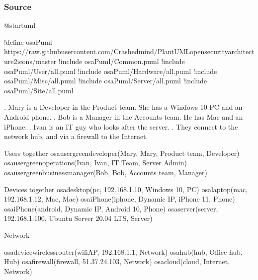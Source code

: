 \documentclass[letterpaper,10pt,english]{sphinxmanual}
\begin{document}
\subsubsection{Source}
\label{\detokenize{NetworkUsersMachines/NetworkUsersMachines:id12}}
%
\begin{sphinxVerbatim}[commandchars=\\\{\},numbers=left,firstnumber=1,stepnumber=1]
@startuml

!define osaPuml https://raw.githubusercontent.com/Crashedmind/PlantUML\PYGZhy{}opensecurityarchitecture2\PYGZhy{}icons/master
!include osaPuml/Common.puml
!include osaPuml/User/all.puml
!include osaPuml/Hardware/all.puml
!include osaPuml/Misc/all.puml
!include osaPuml/Server/all.puml
!include osaPuml/Site/all.puml

\PYGZsq{}. Mary is a Developer in the Product team. She has a Windows 10 PC and an Android phone.
\PYGZsq{}. Bob is a Manager in the Accounts team. He has Mac and an iPhone.
\PYGZsq{}. Ivan is an IT guy who looks after the server. 
\PYGZsq{}. They connect to the network hub, and via a firewall to the Internet.


\PYGZsq{} Users
together \PYGZob{}
osa\PYGZus{}user\PYGZus{}green\PYGZus{}developer(Mary, \PYGZdq{}Mary\PYGZdq{}, \PYGZdq{}Product team\PYGZdq{}, \PYGZdq{}Developer\PYGZdq{})
osa\PYGZus{}user\PYGZus{}green\PYGZus{}operations(Ivan, \PYGZdq{}Ivan\PYGZdq{}, \PYGZdq{}IT Team\PYGZdq{}, \PYGZdq{}Server Admin\PYGZdq{})
osa\PYGZus{}user\PYGZus{}green\PYGZus{}business\PYGZus{}manager(Bob, \PYGZdq{}Bob\PYGZdq{}, \PYGZdq{}Accounts team\PYGZdq{}, \PYGZdq{}Manager\PYGZdq{})
\PYGZcb{}

\PYGZsq{} Devices
together \PYGZob{}
osa\PYGZus{}desktop(pc, \PYGZdq{}192.168.1.10\PYGZdq{}, \PYGZdq{}Windows 10\PYGZdq{}, \PYGZdq{}PC\PYGZdq{})
osa\PYGZus{}laptop(mac, \PYGZdq{}192.168.1.12\PYGZdq{}, \PYGZdq{}Mac\PYGZdq{}, \PYGZdq{}Mac\PYGZdq{})
osa\PYGZus{}iPhone(iphone, \PYGZdq{}Dynamic IP\PYGZdq{}, \PYGZdq{}iPhone 11\PYGZdq{}, \PYGZdq{}Phone\PYGZdq{})
osa\PYGZus{}iPhone(android, \PYGZdq{}Dynamic IP\PYGZdq{}, \PYGZdq{}Android 10\PYGZdq{}, \PYGZdq{}Phone\PYGZdq{})
osa\PYGZus{}server(server, \PYGZdq{}192.168.1.100\PYGZdq{}, \PYGZdq{}Ubuntu Server 20.04 LTS\PYGZdq{}, \PYGZdq{}Server\PYGZdq{})
\PYGZcb{}


\PYGZsq{} Network

osa\PYGZus{}device\PYGZus{}wireless\PYGZus{}router(wifiAP, \PYGZdq{}192.168.1.1\PYGZdq{}, \PYGZdq{}Network\PYGZdq{})
osa\PYGZus{}hub(hub, \PYGZdq{}Office hub\PYGZdq{}, \PYGZdq{}Hub\PYGZdq{})
osa\PYGZus{}firewall(firewall, \PYGZdq{}51.37.24.103\PYGZdq{}, \PYGZdq{}Network\PYGZdq{})
osa\PYGZus{}cloud(cloud, \PYGZdq{}Internet\PYGZdq{}, \PYGZdq{}Network\PYGZdq{})



\end{sphinxVerbatim}
\end{document}
